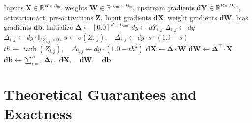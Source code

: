 \documentclass[11pt]{article}
\begin{document}
\begin{algorithm}[H]
\caption{Layer-by-Layer Affine Backpropagation}
\label{alg:layer_backprop}
\begin{algorithmic}[1]
\Require Inputs $\mathbf{X} \in \mathbb{R}^{B \times D_{\mathrm{in}}}$, weights $\mathbf{W} \in \mathbb{R}^{D_{\mathrm{out}} \times D_{\mathrm{in}}}$, upstream gradients $\mathbf{dY} \in \mathbb{R}^{B \times D_{\mathrm{out}}}$, activation $\mathrm{act}$, pre-activations $\mathbf{Z}$.
\Ensure Input gradients $\mathbf{dX}$, weight gradients $\mathbf{dW}$, bias gradients $\mathbf{db}$.
\State Initialize $\mathbf{\Delta} \gets [0.0]^{B \times D_{\mathrm{out}}}$
        \State $dy \gets dY_{i, j}$
            \State $\Delta_{i, j} \gets dy$
            \State $\Delta_{i, j} \gets dy \cdot \mathbb{I}_{\{Z_{i, j} > 0\}}$
            \State $s \gets \sigma(Z_{i, j}), \quad \Delta_{i, j} \gets dy \cdot s \cdot (1.0 - s)$
            \State $th \gets \tanh(Z_{i, j}), \quad \Delta_{i, j} \gets dy \cdot (1.0 - th^2)$
        \EndIf
    \EndFor
\EndFor
\State $\mathbf{dX} \gets \mathbf{\Delta} \cdot \mathbf{W}$ 
\State $\mathbf{dW} \gets \mathbf{\Delta}^\top \cdot \mathbf{X}$ 
\State $\mathbf{db} \gets \sum_{i=1}^B \mathbf{\Delta}_{i, :}$ 
\State \Return $\mathbf{dX}, \quad \mathbf{dW}, \quad \mathbf{db}$
\end{algorithmic}
\end{algorithm}

\section{Theoretical Guarantees and Exactness}
\label{sec:guarantees}
\end{document}
